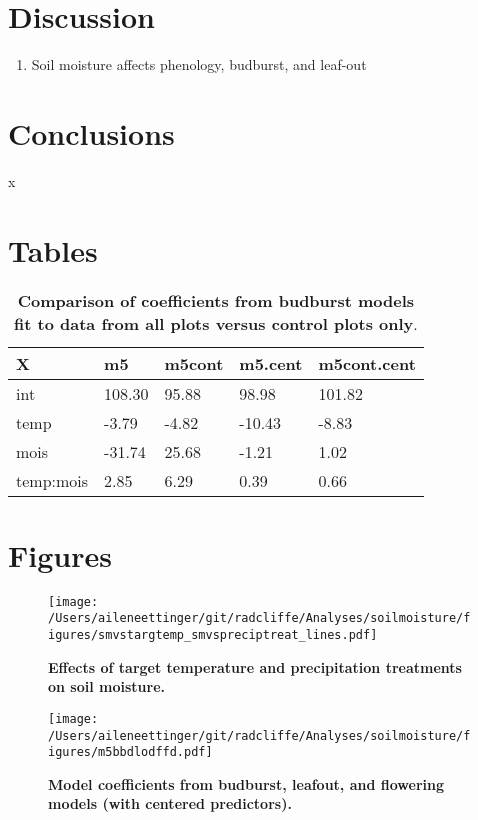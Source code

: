 \documentclass{article}
\begin{document}
\section* {Discussion}
\begin{enumerate}
\item Soil moisture affects phenology, budburst, and  leaf-out
\end{enumerate}
\section* {Conclusions}

x

\clearpage
\section* {Tables}
\begin{table}[ht]
\centering
\caption{\textbf{Comparison of coefficients from budburst models fit to data from all plots versus control plots only}.} 
\label{tab:warmtech}
\begin{tabular}{|p{}|p{}|p{}|p{}|p{}|}
  \hline
X & m5 & m5cont & m5.cent & m5cont.cent \\ 
  \hline
int & 108.30 & 95.88 & 98.98 & 101.82 \\ 
  temp & -3.79 & -4.82 & -10.43 & -8.83 \\ 
  mois & -31.74 & 25.68 & -1.21 & 1.02 \\ 
  temp:mois & 2.85 & 6.29 & 0.39 & 0.66 \\ 
   \hline
\end{tabular}
\end{table}
\clearpage
\clearpage
\section* {Figures}
\clearpage
 \begin{figure}[h]
\centering
 \texttt{[image: /Users/aileneettinger/git/radcliffe/Analyses/soilmoisture/figures/smvstargtemp\_smvspreciptreat\_lines.pdf]}
 \caption{\textbf{Effects of target temperature and precipitation treatments on soil moisture.}} 
 \label{fig:soilmois}
 \end{figure}

\begin{figure}[h]
\centering
 \texttt{[image: /Users/aileneettinger/git/radcliffe/Analyses/soilmoisture/figures/m5bbdlodffd.pdf]}
 \caption{\textbf{Model coefficients from budburst, leafout, and flowering models (with centered predictors).}} 
 \label{fig:bb}
 \end{figure}
\end{document}
